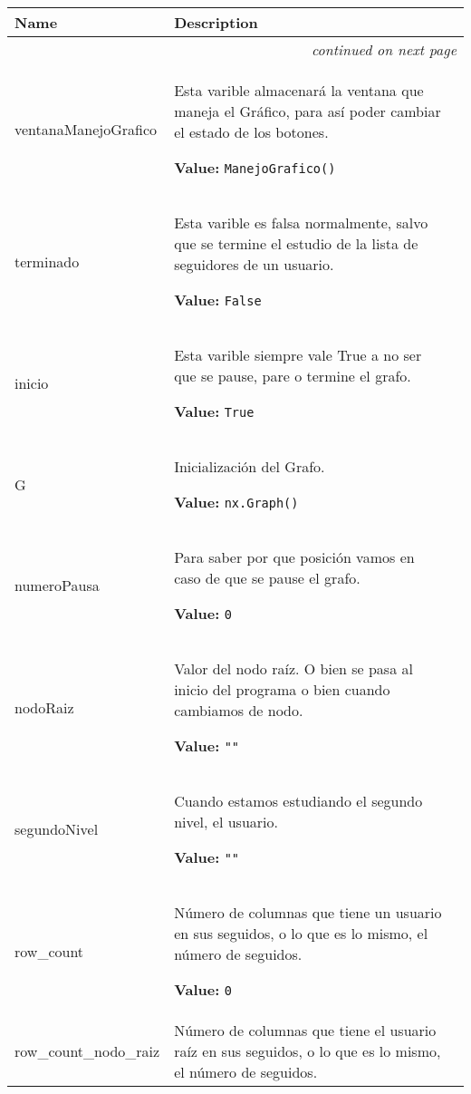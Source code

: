     \vspace{-1cm}
\hspace{\varindent}\begin{longtable}{|p{\varnamewidth}|p{\vardescrwidth}|l}
\cline{1-2}
\cline{1-2} \centering \textbf{Name} & \centering \textbf{Description}& \\
\cline{1-2}
\endhead\cline{1-2}\multicolumn{3}{r}{\small\textit{continued on next page}}\\\endfoot\cline{1-2}
\endlastfoot\raggedright v\-e\-n\-t\-a\-n\-a\-M\-a\-n\-e\-j\-o\-G\-r\-a\-f\-i\-c\-o\- & \raggedright Esta varible almacenará la ventana que maneja el Gráfico, para 
          así poder cambiar el estado de los botones.

\textbf{Value:} 
{\tt ManejoGrafico()}&\\
\cline{1-2}
\raggedright t\-e\-r\-m\-i\-n\-a\-d\-o\- & \raggedright Esta varible es falsa normalmente, salvo que se termine el 
          estudio de la lista de seguidores de un usuario.

\textbf{Value:} 
{\tt False}&\\
\cline{1-2}
\raggedright i\-n\-i\-c\-i\-o\- & \raggedright Esta varible siempre vale True a no ser que se pause, pare o 
          termine el grafo.

\textbf{Value:} 
{\tt True}&\\
\cline{1-2}
\raggedright G\- & \raggedright Inicialización del Grafo.

\textbf{Value:} 
{\tt nx.Graph()}&\\
\cline{1-2}
\raggedright n\-u\-m\-e\-r\-o\-P\-a\-u\-s\-a\- & \raggedright Para saber por que posición vamos en caso de que se pause el 
          grafo.

\textbf{Value:} 
{\tt 0}&\\
\cline{1-2}
\raggedright n\-o\-d\-o\-R\-a\-i\-z\- & \raggedright Valor del nodo raíz. O bien se pasa al inicio del programa o bien
          cuando cambiamos de nodo.

\textbf{Value:} 
{\tt ""}&\\
\cline{1-2}
\raggedright s\-e\-g\-u\-n\-d\-o\-N\-i\-v\-e\-l\- & \raggedright Cuando estamos estudiando el segundo nivel, el usuario.

\textbf{Value:} 
{\tt ""}&\\
\cline{1-2}
\raggedright r\-o\-w\-\_\-c\-o\-u\-n\-t\- & \raggedright Número de columnas que tiene un usuario en sus seguidos, o lo que
          es lo mismo, el número de seguidos.

\textbf{Value:} 
{\tt 0}&\\
\cline{1-2}
\raggedright r\-o\-w\-\_\-c\-o\-u\-n\-t\-\_\-n\-o\-d\-o\-\_\-r\-a\-i\-z\- & \raggedright Número de columnas que tiene el usuario raíz en sus seguidos, o 
          lo que es lo mismo, el número de seguidos.


\end{longtable}
